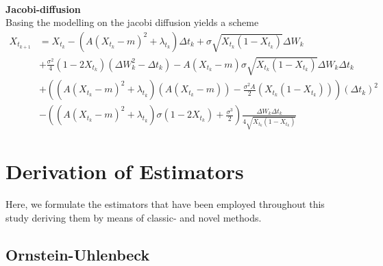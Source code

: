 \\
\textbf{Jacobi-diffusion}\\
Basing the modelling on the jacobi diffusion yields a scheme
\begin{align}
    X_{t_{k + 1}} &= X_{t_k} - \left(A(X_{t_k} - m)^2 + \lambda_{t_k}\right) \Delta t_k + \sigma \sqrt{X_{t_k}\left(1-X_{t_k}\right)} \Delta W_{k} \nonumber\\
    &+ \frac{\sigma^2}{4}\left(1 - 2X_{t_k}\right)\left(\Delta W_k^2 - \Delta t_k\right) - A\left(X_{t_k} - m\right)\sigma \sqrt{X_{t_k}\left(1 - X_{t_k}\right)}\Delta W_k\Delta t_k \nonumber \\
    &+ \left(\left(A\left(X_{t_k} - m\right)^2 + \lambda_{t_k}\right)\left(A\left(X_{t_k} - m\right)\right) - \frac{\sigma^2A}{2}\left(X_{t_k}\left(1 - X_{t_k}\right)\right)\right)\left(\Delta t_k\right)^2 \nonumber \\
    &- \left(\left(A\left(X_{t_k} - m\right)^2 + \lambda_{t_k}\right)\sigma\left(1 - 2X_{t_k}\right) + \frac{\sigma^3}{2}\right)\frac{\Delta W_k \Delta t_k}{4\sqrt{X_{t_k}\left(1 - X_{t_k}\right)}} \label{eq:jacobiDiffusion}
\end{align}
\section{Derivation of Estimators}\label{sec:AppendixEstim}
Here, we formulate the estimators that have been employed throughout this study deriving them by means of classic- and novel methods.
\subsection{Ornstein-Uhlenbeck}\label{subsec:OUprocess}
